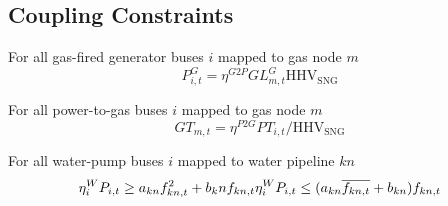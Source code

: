 \subsection{Coupling Constraints}

For all gas-fired generator buses $i$ mapped to gas node $m$ \atallt{}
\begin{equation}
  P^G_{i,t} = \eta^{G2P} GL^G_{m,t} \text{HHV}_{\text{SNG}}
\end{equation}

For all power-to-gas buses $i$ mapped to gas node $m$ \atallt{}
\begin{equation}
  GT_{m,t} =  \eta^{P2G} PT_{i,t} /\text{HHV}_\text{SNG}
\end{equation}

For all water-pump buses $i$ mapped to water pipeline $kn$ \atallt{}
\begin{equation}
  \eta^W_i P_{i,t} \geq a_{kn} f^2_{kn,t} + b_kn f_{kn,t}
  \eta^W_i P_{i,t} \leq (a_{kn} \overline{f_{kn,t}} + b_{kn}) f_{kn,t}
\end{equation}
